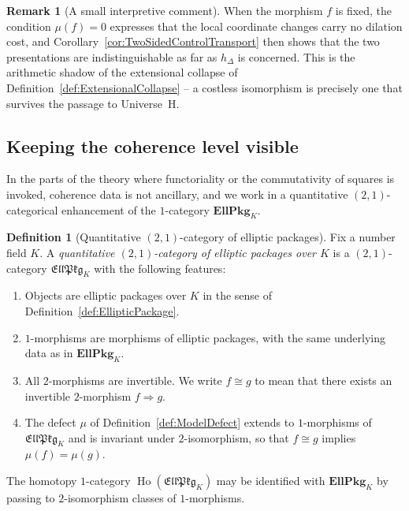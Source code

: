 \documentclass[10pt, reqno]{amsart}
\theoremstyle{plain}
\theoremstyle{definition}
\newtheorem{definition}[theorem]{Definition}
\newtheorem{remark}[theorem]{Remark}
\theoremstyle{plain}
\newcommand{\Ho}{\operatorname{Ho}}
\begin{document}
\begin{remark}[A small interpretive comment]\label{rem:ZeroCostInterpretation}
When the morphism $f$ is fixed, the condition $\mu(f)=0$ expresses that the local coordinate changes carry no dilation cost, and Corollary~\ref{cor:TwoSidedControlTransport} then shows that the two presentations are indistinguishable as far as $h_\Delta$ is concerned. This is the arithmetic shadow of the extensional collapse of Definition~\ref{def:ExtensionalCollapse} -- a costless isomorphism is precisely one that survives the passage to Universe~H.
\end{remark}

\subsection{Keeping the coherence level visible}\label{subsec:EllPkgTwoOne}

In the parts of the theory where functoriality or the commutativity of squares is invoked, coherence data is not ancillary, and we work in a quantitative $(2,1)$-categorical enhancement of the $1$-category $\mathbf{EllPkg}_K$.

\begin{definition}[Quantitative $(2,1)$-category of elliptic packages]\label{def:EllPkgTwoOne}
Fix a number field $K$. A \emph{quantitative $(2,1)$-category of elliptic packages over $K$} is a $(2,1)$-category $\mathfrak{EllPkg}_K$ with the following features:
\begin{enumerate}
\item[\textup{(i)}] Objects are elliptic packages over $K$ in the sense of Definition~\ref{def:EllipticPackage}.
\item[\textup{(ii)}] $1$-morphisms are morphisms of elliptic packages, with the same underlying data as in $\mathbf{EllPkg}_K$.
\item[\textup{(iii)}] All $2$-morphisms are invertible. We write $f \cong g$ to mean that there exists an invertible $2$-morphism $f \Rightarrow g$.
\item[\textup{(iv)}] The defect $\mu$ of Definition~\ref{def:ModelDefect} extends to $1$-morphisms of $\mathfrak{EllPkg}_K$ and is invariant under $2$-isomorphism, so that $f \cong g$ implies $\mu(f)=\mu(g)$.
\end{enumerate}
The homotopy $1$-category $\Ho(\mathfrak{EllPkg}_K)$ may be identified with $\mathbf{EllPkg}_K$ by passing to $2$-isomorphism classes of $1$-morphisms.
\end{definition}
\end{document}
